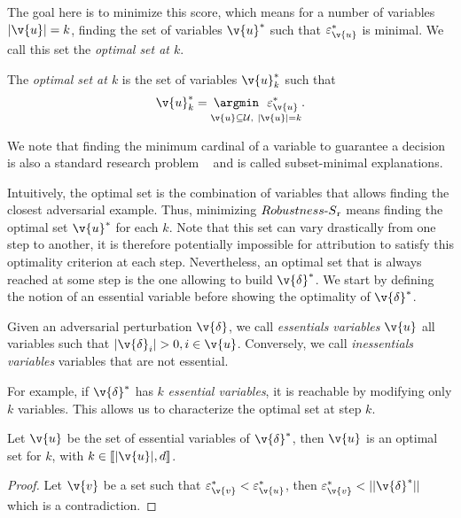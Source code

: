 The goal here is to minimize this score, which means for a number of variables $|\v{u}| = k$, finding the set of variables $\v{u}^*$ such that $\varepsilon^*_{\v{u}}$ is minimal. We call this set the \textit{optimal set at $k$}. 

\begin{definition}
The \textit{optimal set at $k$} is the set of variables $\v{u}^{*}_k $ such that 
$$ \v{u}^{*}_k = \underset{ \v{u} \subseteq \mathcal{U},~ |\v{u}| = k}{\argmin ~~ \varepsilon^*_{\v{u}} }. $$
\end{definition}

We note that finding the minimum cardinal of a variable to guarantee a decision is also a standard research problem  ~\cite{ignatiev2019abduction, ignatiev2019relating} and is called subset-minimal explanations. 

Intuitively, the optimal set is the combination of variables that allows finding the closest adversarial example.
Thus, minimizing ${Robustness\text{-}S\textsubscript{r}}$ means finding the optimal set $\v{u}^*$ for each $k$. 
Note that this set can vary drastically from one step to another, it is therefore potentially impossible for attribution to satisfy this optimality criterion at each step.
Nevertheless, an optimal set that is always reached at some step is the one allowing to build $\v{\delta}^*$.
We start by defining the notion of an essential variable before showing the optimality of $\v{\delta}^*$.

\begin{definition}
Given an adversarial perturbation $\v{\delta}$, we call \textit{essentials variables} $\v{u}$ all variables such that $|\v{\delta}_{i}| > 0, i \in \v{u}$. Conversely, we call \textit{inessentials variables} variables that are not essential.
\end{definition}

For example, if $\v{\delta}^*$ has $k$ \textit{essential variables}, it is reachable by modifying only $k$ variables. 
This allows us to characterize the optimal set at step $k$.

\begin{proposition} 
\label{prop:eva:uoptimal}
Let $\v{u}$ be the set of essential variables of $\v{\delta}^*$, then $\v{u}$ is an optimal set for $k$, with $k \in [\![|\v{u}|,d]\!] $.
\end{proposition}

\begin{proof}
Let $\v{v}$ be a set such that $ \varepsilon^*_{\v{v}} < \varepsilon^*_{\v{u}} $, then $ \varepsilon^*_{\v{v}} < || \v{\delta}^* || $ which is a contradiction.
\end{proof}

